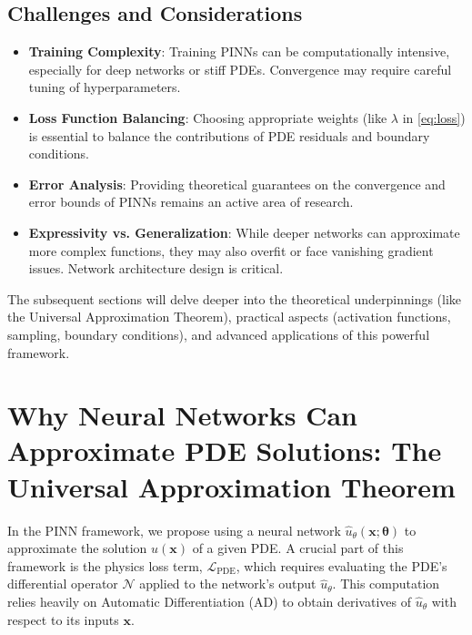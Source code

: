\subsection{Challenges and Considerations}

\begin{itemize}
    \item \textbf{Training Complexity}: Training PINNs can be computationally intensive, especially for deep networks or stiff PDEs. Convergence may require careful tuning of hyperparameters.

    \item \textbf{Loss Function Balancing}: Choosing appropriate weights (like $\lambda$ in \eqref{eq:loss}) is essential to balance the contributions of PDE residuals and boundary conditions.

    \item \textbf{Error Analysis}: Providing theoretical guarantees on the convergence and error bounds of PINNs remains an active area of research.

    \item \textbf{Expressivity vs. Generalization}: While deeper networks can approximate more complex functions, they may also overfit or face vanishing gradient issues. Network architecture design is critical.
\end{itemize}

The subsequent sections will delve deeper into the theoretical underpinnings (like the Universal Approximation Theorem), practical aspects (activation functions, sampling, boundary conditions), and advanced applications of this powerful framework.


\section{Why Neural Networks Can Approximate PDE Solutions: The Universal Approximation Theorem}
\label{sec:uat_pinns}

In the PINN framework, we propose using a neural network $\hat{u}_\theta(\mathbf{x}; \boldsymbol{\theta})$ to approximate the solution $u(\mathbf{x})$ of a given PDE. 
A crucial part of this framework is the physics loss term, $\mathcal{L}_{\text{PDE}}$, which requires evaluating the PDE's differential operator $\mathcal{N}$ applied to the network's output $\hat{u}_\theta$. 
This computation relies heavily on Automatic Differentiation (AD) to obtain derivatives of $\hat{u}_\theta$ with respect to its inputs $\mathbf{x}$.

